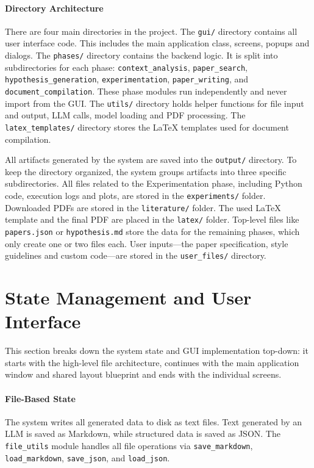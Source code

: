 \paragraph{Directory Architecture}
There are four main directories in the project.
The \texttt{gui/} directory contains all user interface code.
This includes the main application class, screens, popups and dialogs.
The \texttt{phases/} directory contains the backend logic.
It is split into subdirectories for each phase: \texttt{context\_analysis}, \texttt{paper\_search}, \texttt{hypothesis\_\allowbreak{}generation}, \texttt{experimentation}, \texttt{paper\_writing}, and \texttt{document\_compilation}.
These phase modules run independently and never import from the GUI.
The \texttt{utils/} directory holds helper functions for file input and output, LLM calls, model loading and PDF processing.
The \texttt{latex\_templates/} directory stores the \LaTeX{} templates used for document compilation.

All artifacts generated by the system are saved into the \texttt{output/} directory.
To keep the directory organized, the system groups artifacts into three specific subdirectories.
All files related to the Experimentation phase, including Python code, execution logs and plots, are stored in the \texttt{experiments/} folder.
Downloaded PDFs are stored in the \texttt{literature/} folder.
The used \LaTeX{} template and the final PDF are placed in the \texttt{latex/} folder.
Top-level files like \texttt{papers.json} or \texttt{hypothesis.md} store the data for the remaining phases, which only create one or two files each.
User inputs---the paper specification, style guidelines and custom code---are stored in the \texttt{user\_files/} directory.




\section{State Management and User Interface}

This section breaks down the system state and GUI implementation top-down: it starts with the high-level file architecture, continues with the main application window and shared layout blueprint and ends with the individual screens.

\paragraph{File-Based State}
The system writes all generated data to disk as text files.
Text generated by an LLM is saved as Markdown, while structured data is saved as JSON.
The \texttt{file\_utils} module handles all file operations via \texttt{save\_markdown}, \texttt{load\_markdown}, \texttt{save\_json}, and \texttt{load\_json}.

